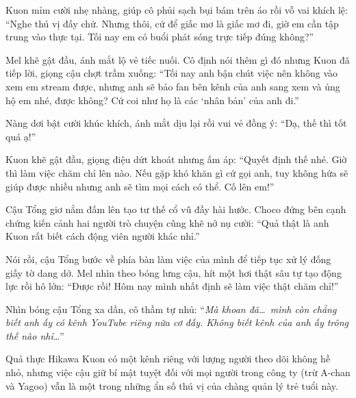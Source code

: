 \documentclass[../main.tex]{subfiles}
\begin{document}
Kuon mỉm cười nhẹ nhàng, giúp cô phủi sạch bụi bám trên áo rồi vỗ vai khích lệ: ``Nghe thú vị đấy chứ. Nhưng thôi, cứ để giấc mơ là giấc mơ đi, giờ em cần tập trung vào thực tại. Tối nay em có buổi phát sóng trực tiếp đúng không?''

Mel khẽ gật đầu, ánh mắt lộ vẻ tiếc nuối. Cô định nói thêm gì đó nhưng Kuon đã tiếp lời, giọng cậu chợt trầm xuống: ``Tối nay anh bận chút việc nên không vào xem em stream được, nhưng anh sẽ bảo fan bên kênh của anh sang xem và ủng hộ em nhé, được không? Cứ coi như họ là các `nhân bản' của anh đi.''

Nàng dơi bật cười khúc khích, ánh mắt dịu lại rồi vui vẻ đồng ý: ``Dạ, thế thì tốt quá ạ!''

Kuon khẽ gật đầu, giọng điệu dứt khoát nhưng ấm áp: ``Quyết định thế nhé. Giờ thì làm việc chăm chỉ lên nào. Nếu gặp khó khăn gì cứ gọi anh, tuy không hứa sẽ giúp được nhiều nhưng anh sẽ tìm mọi cách có thể. Cố lên em!''

Cậu Tổng giơ nắm đấm lên tạo tư thế cổ vũ đầy hài hước. Choco đứng bên cạnh chứng kiến cảnh hai người trò chuyện cũng khẽ nở nụ cười: ``Quả thật là anh Kuon rất biết cách động viên người khác nhỉ.''

Nói rồi, cậu Tổng bước về phía bàn làm việc của mình để tiếp tục xử lý đống giấy tờ dang dở. Mel nhìn theo bóng lưng cậu, hít một hơi thật sâu tự tạo động lực rồi hô lớn: ``Được rồi! Hôm nay mình nhất định sẽ làm việc thật chăm chỉ!''

Nhìn bóng cậu Tổng xa dần, cô thầm tự nhủ: ``\textit{Mà khoan đã\dots\ mình còn chẳng biết anh ấy có kênh YouTube riêng nữa cơ đấy. Không biết kênh của anh ấy trông thế nào nhỉ\dots}''

Quả thực Hikawa Kuon có một kênh riêng với lượng người theo dõi không hề nhỏ, nhưng việc cậu giữ bí mật tuyệt đối với mọi người trong công ty (trừ A-chan và Yagoo) vẫn là một trong những ẩn số thú vị của chàng quản lý trẻ tuổi này.
\end{document}
